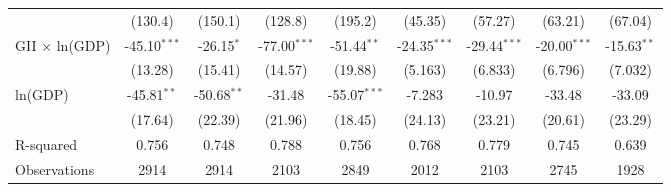 \documentclass[9pt,letterpaper,subeqn]{beamer}
\begin{document}
\begin{frame}
\begin{table}[htbp]
{\begin{tabular}{l*{8}{c}}
            &     (130.4)         &     (150.1)         &     (128.8)         &     (195.2)         &     (45.35)         &     (57.27)         &     (63.21)         &     (67.04)         \\
GII $\times$ ln(GDP)&      -45.10$^{***}$&      -26.15$^{*}$  &      -77.00$^{***}$&      -51.44$^{**}$ &      -24.35$^{***}$&      -29.44$^{***}$&      -20.00$^{***}$&      -15.63$^{**}$ \\
            &     (13.28)         &     (15.41)         &     (14.57)         &     (19.88)         &     (5.163)         &     (6.833)         &     (6.796)         &     (7.032)         \\
ln(GDP)             &      -45.81$^{**}$ &      -50.68$^{**}$ &      -31.48         &      -55.07$^{***}$&      -7.283         &      -10.97         &      -33.48         &      -33.09         \\
            &     (17.64)         &     (22.39)         &     (21.96)         &     (18.45)         &     (24.13)         &     (23.21)         &     (20.61)         &     (23.29)         \\
\midrule
R-squared           &       0.756         &       0.748         &       0.788         &       0.756         &       0.768         &       0.779         &       0.745         &       0.639         \\
Observations        &        2914         &        2914         &        2103         &        2849         &        2012         &        2103         &        2745         &        1928         \\
\bottomrule\end{tabular}}\end{table}
\end{frame}





\end{document}
